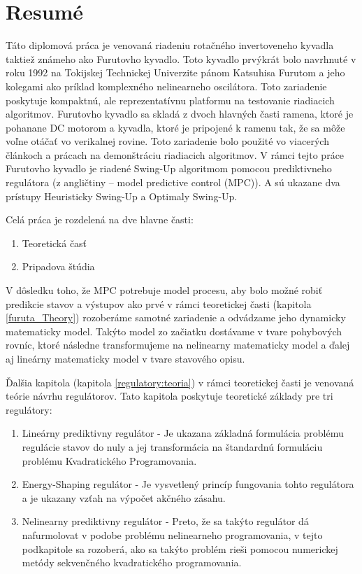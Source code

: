 \chapter{Resumé}
\label{ch:resume}
Táto diplomová práca je venovaná riadeniu rotačného invertoveneho kyvadla taktiež známeho ako Furutovho kyvadlo. Toto kyvadlo prvýkrát bolo navrhnuté v roku 1992 na Tokijskej Technickej Univerzite pánom Katsuhisa Furutom a jeho kolegami ako príklad komplexného nelinearneho oscilátora. Toto zariadenie poskytuje kompaktnú, ale reprezentatívnu platformu na testovanie riadiacich algoritmov. Furutovho kyvadlo sa skladá z dvoch hlavných časti ramena, ktoré je pohanane DC motorom a kyvadla, ktoré je pripojené k ramenu tak, že sa môže voľne otáčať vo verikalnej rovine. Toto zariadenie bolo použité vo viacerých článkoch a prácach na demonštráciu riadiacich algoritmov. V rámci tejto práce Furutovho kyvadlo je riadené Swing-Up algoritmom pomocou prediktivneho regulátora (z angličtiny – model predictive control (MPC)). A sú ukazane dva prístupy Heuristicky Swing-Up a Optimaly Swing-Up.

Celá práca je rozdelená na dve hlavne časti:
\begin{enumerate}
	\item Teoretická časť
	\item Pripadova štúdia
\end{enumerate}

V dôsledku toho, že MPC potrebuje model procesu, aby bolo možné robiť predikcie stavov a výstupov ako prvé v rámci teoretickej časti (kapitola \ref{furuta_Theory}) rozoberáme samotné zariadenie a odvádzame jeho dynamicky matematicky model. Takýto model zo začiatku dostávame v tvare pohybových rovníc, ktoré následne transformujeme na nelinearny matematicky model a ďalej aj lineárny matematicky model v tvare stavového opisu.

Ďalšia kapitola (kapitola \ref{regulatory:teoria}) v rámci teoretickej časti je venovaná teórie návrhu regulátorov. Tato kapitola poskytuje teoretické základy pre tri regulátory:
\begin{enumerate}
	\item Lineárny prediktivny regulátor - Je ukazana základná formulácia problému regulácie stavov do nuly a jej transformácia na štandardnú formuláciu problému Kvadratického Programovania.
\item Energy-Shaping regulátor - Je vysvetlený princíp fungovania tohto regulátora a je ukazany vzťah na výpočet akčného zásahu.
\item Nelinearny prediktivny regulátor - Preto, že sa takýto regulátor dá nafurmolovat v podobe problému nelinearneho programovania, v tejto podkapitole sa rozoberá, ako sa takýto problém rieši pomocou numerickej metódy sekvenčného kvadratického programovania. 
\end{enumerate}

